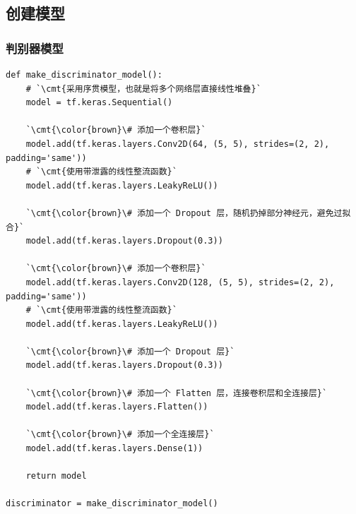 \documentclass[a4paper, 12pt]{article}
\begin{document}
\subsection{创建模型}

\subsubsection{判别器模型}
\begin{lstlisting}[style=myPython,caption={创建判别器模型}]
def make_discriminator_model():
    # `\cmt{采用序贯模型，也就是将多个网络层直接线性堆叠}`
    model = tf.keras.Sequential()

    `\cmt{\color{brown}\# 添加一个卷积层}`
    model.add(tf.keras.layers.Conv2D(64, (5, 5), strides=(2, 2), padding='same'))
    # `\cmt{使用带泄露的线性整流函数}`
    model.add(tf.keras.layers.LeakyReLU())

    `\cmt{\color{brown}\# 添加一个 Dropout 层，随机扔掉部分神经元，避免过拟合}`
    model.add(tf.keras.layers.Dropout(0.3))
      
    `\cmt{\color{brown}\# 添加一个卷积层}`
    model.add(tf.keras.layers.Conv2D(128, (5, 5), strides=(2, 2), padding='same'))
    # `\cmt{使用带泄露的线性整流函数}`
    model.add(tf.keras.layers.LeakyReLU())

    `\cmt{\color{brown}\# 添加一个 Dropout 层}`
    model.add(tf.keras.layers.Dropout(0.3))
    
    `\cmt{\color{brown}\# 添加一个 Flatten 层，连接卷积层和全连接层}`
    model.add(tf.keras.layers.Flatten())

    `\cmt{\color{brown}\# 添加一个全连接层}`
    model.add(tf.keras.layers.Dense(1))
     
    return model

discriminator = make_discriminator_model()
\end{lstlisting}
\end{document}
